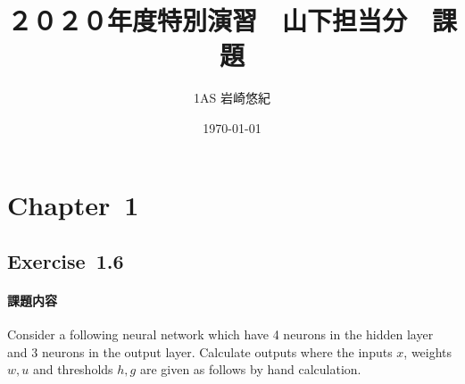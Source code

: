 \documentclass[11pt, a4paper]{jsarticle}
\title{２０２０年度特別演習　山下担当分　課題}
\author{1AS 岩崎悠紀}
\date{\today}
\begin{document}
  \maketitle

  \section{Chapter~1}
  \subsection{Exercise~1.6}
  \paragraph{ 課題内容}
  Consider a following neural network which have 4 neurons in the hidden layer and 3 neurons in the output layer. Calculate outputs where the inputs $ x $, weights $ w, u $ and thresholds $ h, g $ are given as follows by hand calculation.
\end{document}
